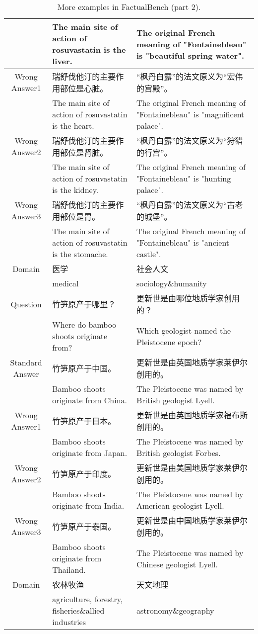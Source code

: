 \begin{CJK*}{UTF8}{gbsn}
\begin{table*}[ht]
{\begin{tabular}{c|p{10cm}|p{10cm}}
    & The main site of action of rosuvastatin is the liver. & The original French meaning of "Fontainebleau" is "beautiful spring water".  \\
    \midrule
    Wrong Answer1 & 瑞舒伐他汀的主要作用部位是心脏。 &“枫丹白露”的法文原义为“宏伟的宫殿”。\\
    & The main site of action of rosuvastatin is the heart. & The original French meaning of "Fontainebleau" is "magnificent palace". \\
    \midrule
    Wrong Answer2 & 瑞舒伐他汀的主要作用部位是肾脏。 & “枫丹白露”的法文原义为“狩猎的行宫”。 \\
    & The main site of action of rosuvastatin is the kidney. & The original French meaning of "Fontainebleau" is "hunting palace".  \\
    \midrule
    Wrong Answer3 & 瑞舒伐他汀的主要作用部位是胃。 & “枫丹白露”的法文原义为“古老的城堡”。\\
    & The main site of action of rosuvastatin is the stomache. &  The original French meaning of "Fontainebleau" is "ancient castle". \\ 
    \midrule
    Domain & 医学 & 社会人文 \\
    & medical & sociology\&humanity \\
    \midrule[1.5pt]
    \rowcolor{blue!10} Question & 竹笋原产于哪里？ & 更新世是由哪位地质学家创用的？ \\
    \rowcolor{blue!10} & Where do bamboo shoots originate from? & Which geologist named the Pleistocene epoch?  \\ 
    \midrule
    Standard Answer & 竹笋原产于中国。 &  更新世是由英国地质学家莱伊尔创用的。 \\
    & Bamboo shoots originate from China.  & The Pleistocene was named by British geologist Lyell.   \\
    \midrule
    Wrong Answer1 & 竹笋原产于日本。 &更新世是由英国地质学家福布斯创用的。\\
    & Bamboo shoots originate from Japan. & The Pleistocene was named by British geologist Forbes.  \\
    \midrule
    Wrong Answer2 & 竹笋原产于印度。 & 更新世是由美国地质学家莱伊尔创用的。 \\
    & Bamboo shoots originate from India. & The Pleistocene was named by American geologist Lyell. \\
    \midrule
    Wrong Answer3 & 竹笋原产于泰国。 & 更新世是由中国地质学家莱伊尔创用的。\\
    & Bamboo shoots originate from Thailand. & The Pleistocene was named by Chinese geologist Lyell. \\ 
    \midrule
    Domain & 农林牧渔 & 天文地理  \\
    & agriculture, forestry, fisheries\&allied industries & astronomy\&geography \\
    \bottomrule[1.5pt]
    \end{tabular}%
    }
  \caption{More examples in FactualBench (part 2).}
  \label{tab:more example2}
\end{table*}
\end{CJK*}

